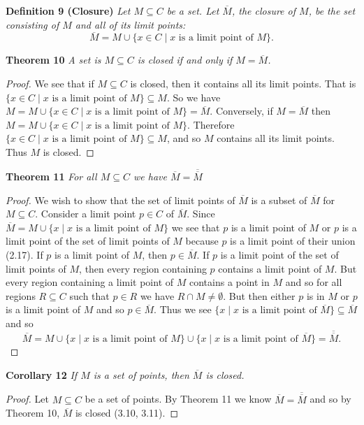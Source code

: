 \documentclass{article}
\begin{document}
\begin{flushleft}
\textbf{Definition 9 (Closure)}
\textsl{Let $M \subseteq C$ be a set. Let $\overline{M}$, the closure of $M$, be the set consisting of $M$ and all of its limit points:
\[
\overline{M} = M \cup \{x \in C \mid x \text{ is a limit point of } M\}.
\]}

\textbf{Theorem 10}
\textsl{A set is $M \subseteq C$ is closed if and only if $M=\overline{M}$.}
\begin{proof}
We see that if $M \subseteq C$ is closed, then it contains all its limit points. That is $\{x \in C \mid x \text{ is a limit point of }M\} \subseteq M$. So we have $M=M \cup \{x \in C \mid x \text{ is a limit point of }M\} = \overline{M}$. Conversely, if $M=\overline{M}$ then $M = M \cup \{x \in C \mid x \text{ is a limit point of }M\}$. Therefore $\{ x \in C \mid x \text{ is a limit point of }M\} \subseteq M$, and so $M$ contains all its limit points. Thus $M$ is closed.
\end{proof}

\textbf{Theorem 11}
\textsl{For all $M \subseteq C$ we have $\overline{M} = \overline{\overline{M}}$}
\begin{proof}
We wish to show that the set of limit points of $\overline{M}$ is a subset of $\overline{M}$ for $M \subseteq C$. Consider a limit point $p \in C$ of $\overline{M}$. Since $\overline{M} = M \cup \{x \mid x \text{ is a limit point of }M\}$ we see that $p$ is a limit point of $M$ or $p$ is a limit point of the set of limit points of $M$ because $p$ is a limit point of their union (2.17). If $p$ is a limit point of $M$, then $p \in \overline{M}$. If $p$ is a limit point of the set of limit points of $M$, then every region containing $p$ contains a limit point of $M$. But every region containing a limit point of $M$ contains a point in $M$ and so for all regions $R \subseteq C$ such that $p \in R$ we have $R \cap M \neq \emptyset$. But then either $p$ is in $M$ or $p$ is a limit point of $M$ and so $p \in \overline{M}$. Thus we see $\{x \mid x \text{ is a limit point of } \overline{M}\} \subseteq \overline{M}$ and so
\[
\overline{M} = M \cup \{x \mid x \text{ is a limit point of }M\} \cup \{x \mid x \text{ is a limit point of }\overline{M}\} = \overline{\overline{M}}.
\]
\end{proof}

\textbf{Corollary 12}
\textsl{If $M$ is a set of points, then $\overline{M}$ is closed.}
\begin{proof}
Let $M \subseteq C$ be a set of points. By Theorem 11 we know $\overline{M} = \overline{\overline{M}}$ and so by Theorem 10, $\overline{M}$ is closed (3.10, 3.11).
\end{proof}


\end{flushleft}
\end{document}

